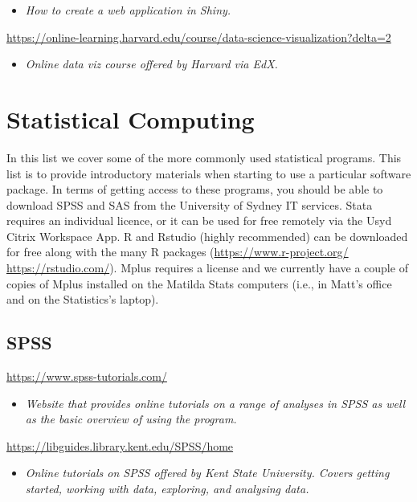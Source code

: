 \documentclass[
]{book}
\providecommand{\tightlist}{%
  \setlength{\itemsep}{0pt}\setlength{\parskip}{0pt}}
\begin{document}
\begin{itemize}
\tightlist
\item
  \emph{How to create a web application in Shiny.}
\end{itemize}

\url{https://online-learning.harvard.edu/course/data-science-visualization?delta=2}

\begin{itemize}
\tightlist
\item
  \emph{Online data viz course offered by Harvard via EdX.}
\end{itemize}

\hypertarget{statistical-computing}{%
\chapter{Statistical Computing}\label{statistical-computing}}

In this list we cover some of the more commonly used statistical programs. This list is to provide introductory materials when starting to use a particular software package. In terms of getting access to these programs, you should be able to download SPSS and SAS from the University of Sydney IT services. Stata requires an individual licence, or it can be used for free remotely via the Usyd Citrix Workspace App. R and Rstudio (highly recommended) can be downloaded for free along with the many R packages (\url{https://www.r-project.org/} \url{https://rstudio.com/}). Mplus requires a license and we currently have a couple of copies of Mplus installed on the Matilda Stats computers (i.e., in Matt's office and on the Statistics's laptop).

\hypertarget{spss}{%
\section{SPSS}\label{spss}}

\url{https://www.spss-tutorials.com/}

\begin{itemize}
\tightlist
\item
  \emph{Website that provides online tutorials on a range of analyses in SPSS as well as the basic overview of using the program.}
\end{itemize}

\url{https://libguides.library.kent.edu/SPSS/home}

\begin{itemize}
\tightlist
\item
  \emph{Online tutorials on SPSS offered by Kent State University. Covers getting started, working with data, exploring, and analysing data.}
\end{itemize}
\end{document}

